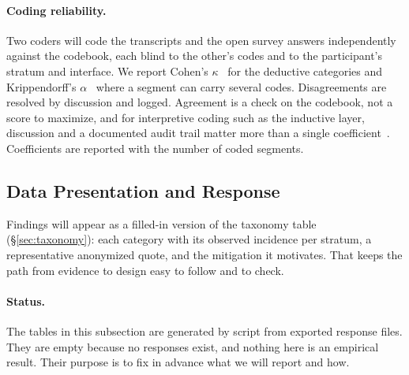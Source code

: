 \documentclass[sigconf]{acmart}
\begin{document}
\paragraph{Coding reliability.}\label{sec:reliability}
Two coders will code the transcripts and the open survey answers independently against the codebook, each blind to the other's codes and to the participant's stratum and interface. We report Cohen's $\kappa$~\cite{cohen1960coefficient} for the deductive categories and Krippendorff's $\alpha$~\cite{krippendorff2018content} where a segment can carry several codes. Disagreements are resolved by discussion and logged. Agreement is a check on the codebook, not a score to maximize, and for interpretive coding such as the inductive layer, discussion and a documented audit trail matter more than a single coefficient~\cite{mcdonald2019reliability}. Coefficients are reported with the number of coded segments.

\subsection{Data Presentation and Response}\label{sec:stats}
Findings will appear as a filled-in version of the taxonomy table (\S\ref{sec:taxonomy}): each category with its observed incidence per stratum, a representative anonymized quote, and the mitigation it motivates. That keeps the path from evidence to design easy to follow and to check.

\paragraph{Status.}
The tables in this subsection are generated by script from exported response files. They are empty because no responses exist, and nothing here is an empirical result. Their purpose is to fix in advance what we will report and how.
\end{document}
